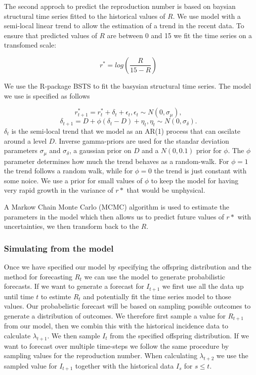 \documentclass[12pt]{article}
\begin{document}
The second approch to predict the reproduction number is based on baysian structural time series fitted to the historical values of $R$. We use model with a semi-local linear trend to allow the estimation of a trend in the recent data. To ensure that predicted values of $R$ are between 0 and 15 we fit the time series on a transfomed scale:

\[ r^* = log\left(\frac{R}{15 - R}\right)\]

We use the R-package BSTS \cite{scottBstsBayesianStructural2019} to fit the basysian structural time series. The model we use is specified as follows

\[r^*_{t+1} = r^*_t + \delta_t + \epsilon_t, \epsilon_t \sim N(0, \sigma_\mu),\]
\[\delta_{t+1} = D + \phi(\delta_t - D) + \eta_t, \eta_t \sim N(0, \sigma_\delta).\]
$\delta_t$ is the semi-local trend that we model as an AR(1) process that can oscilate around a level $D$. Inverse gamma-priors are used for the standar deviation parameters $\sigma_\mu$ and $\sigma_\delta$, a gaussian prior on $D$ and a $N(0, 0.1)$ prior for $\phi$. The $\phi$ parameter determines how much the trend behaves as a random-walk. For $\phi=1$ the trend follows a random walk, while for $\phi=0$ the trend is just constant with some noice. We use a prior for small values of $\phi$ to keep the model for having very rapid growth in the variance of $r*$ that would be unphysical. 

A Markow Chain Monte Carlo (MCMC) algorithm is used to estimate the parameters in the model which then allows us to predict future values of $r*$ with uncertainties, we then transform back to the $R$. 


\subsubsection{Simulating from the model}
Once we have specified our model by specifying the offspring distribution and the method for forecasting $R_t$ we can use the model to generate probabilistic forecasts. If we want to generate a forecast for $I_{t+1}$ we first use all the data up until time $t$ to estimte $R_t$ and potentially fit the time series model to those values. Our probabelistic forecast will be based on sampling possible outcomes to generate a distribution of outcomes. We therefore first sample a value for $R_{t+1}$ from our model, then we combin this with the historical incidence data to calculate $\lambda_{t+1}$. We then sample $I_t$ from the specified offspring distribution. If we want to forecast over multiple time-steps we follow the same procedure by sampling values for the reproduction number. When calculating $\lambda_{t+2}$ we use the sampled value for $I_{t+1}$ together with the historical data ${I_s}$ for $s\leq t$. 
\end{document}
